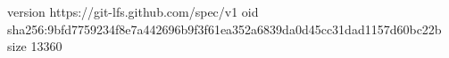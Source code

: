 version https://git-lfs.github.com/spec/v1
oid sha256:9bfd7759234f8e7a442696b9f3f61ea352a6839da0d45cc31dad1157d60bc22b
size 13360

